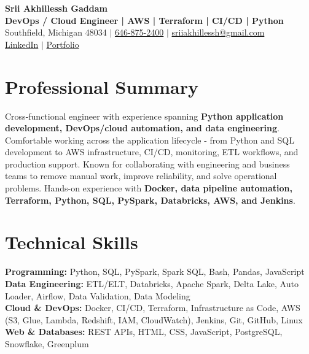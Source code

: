 \documentclass[letterpaper,10pt]{article}
\begin{document}
\fontsize{9.35pt}{10.45pt}\selectfont

\begin{center}
    {\LARGE \textbf{Srii Akhillessh Gaddam}} \\[-1pt]
    \textbf{DevOps / Cloud Engineer | AWS | Terraform | CI/CD | Python} \\[2pt]
    Southfield, Michigan 48034 $|$
    \href{tel:6468752400}{646-875-2400} $|$
    \href{mailto:sriiakhillessh@gmail.com}{sriiakhillessh@gmail.com} \\[1pt]
    \href{https://www.linkedin.com/in/srii-akhiilessh-gaddam-b48668191/}{LinkedIn} $|$
    \href{https://sriiakhillesshg.github.io/portfolio/}{Portfolio}
\end{center}
\vspace{-8pt}

\section{Professional Summary}
\small{Cross-functional engineer with experience spanning \textbf{Python application development, DevOps/cloud automation, and data engineering}. Comfortable working across the application lifecycle - from Python and SQL development to AWS infrastructure, CI/CD, monitoring, ETL workflows, and production support. Known for collaborating with engineering and business teams to remove manual work, improve reliability, and solve operational problems. Hands-on experience with \textbf{Docker, data pipeline automation, Terraform, Python, SQL, PySpark, Databricks, AWS, and Jenkins}.}

\section{Technical Skills}
\small{
\textbf{Programming:} Python, SQL, PySpark, Spark SQL, Bash, Pandas, JavaScript \\
\textbf{Data Engineering:} ETL/ELT, Databricks, Apache Spark, Delta Lake, Auto Loader, Airflow, Data Validation, Data Modeling \\
\textbf{Cloud \& DevOps:} Docker, CI/CD, Terraform, Infrastructure as Code, AWS (S3, Glue, Lambda, Redshift, IAM, CloudWatch), Jenkins, Git, GitHub, Linux \\
\textbf{Web \& Databases:} REST APIs, HTML, CSS, JavaScript, PostgreSQL, Snowflake, Greenplum
}
\end{document}
